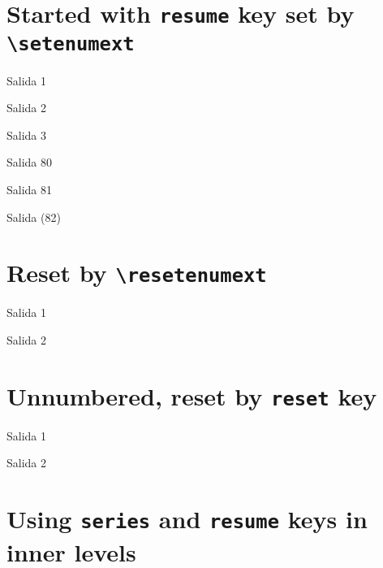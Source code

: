 \documentclass{article}
\begin{document}
\section{Started with \texttt{resume} key set by \texttt{\textbackslash setenumext}}
\begin{enumext}[columns=2]
  \item Salida 1
  \item Salida 2
  \item Salida 3
\end{enumext}

\begin{enumext}[label=\arabic*.,start=80]%
  \item Salida 80
  \item Salida 81
\end{enumext}

\begin{enumext}
  \item Salida (82)
\end{enumext}

\section{Reset by \texttt{\textbackslash resetenumext}}

\begin{enumext}
  \item Salida 1
  \item Salida 2
\end{enumext}

\section*{Unnumbered, reset by \texttt{reset} key}

\begin{enumext}[reset]
  \item Salida 1
  \item Salida 2
\end{enumext}

\section{Using \texttt{series} and \texttt{resume} keys in inner levels}
\end{document}
